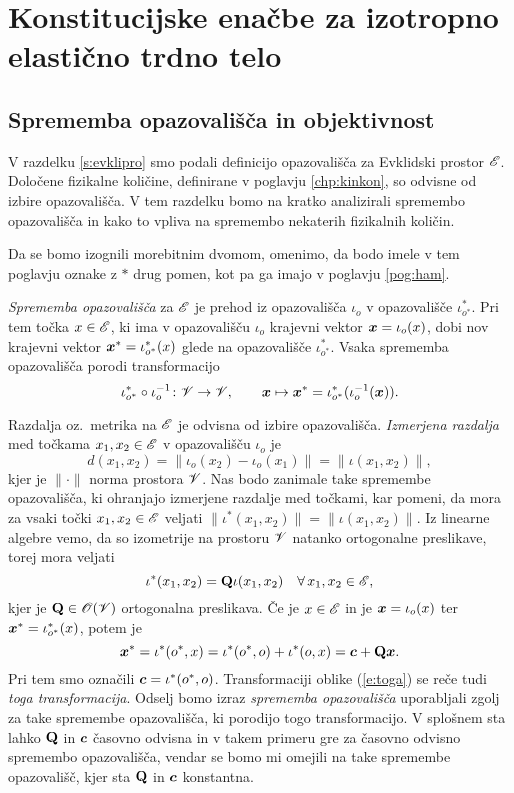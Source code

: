 \appendix

\chapter{Konstitucijske enačbe za izotropno elastično trdno telo}


\section{Sprememba opazovališča in objektivnost}


V razdelku \ref{s:evklipro} smo podali definicijo opazovališča za Evklidski
prostor $\mathscr E$. Določene fizikalne količine, definirane v poglavju \ref{chp:kinkon},
so odvisne od izbire opazovališča. V tem razdelku bomo na kratko analizirali spremembo opazovališča
in kako to vpliva na spremembo nekaterih fizikalnih količin.

Da se bomo izognili morebitnim dvomom, omenimo, da bodo imele
v tem poglavju oznake z $*$ drug pomen, kot pa ga imajo v poglavju \ref{pog:ham}.

\emph{Sprememba opazovališča} za $\mathscr E$ je prehod iz opazovališča $\iota_o$ v opazovališče
$\iota^*_{o^*}$. Pri tem točka $x\in\mathscr E$, ki ima v opazovališču $\iota_o$ krajevni vektor
$\boldsymbol x=\iota_o(x)$, dobi nov krajevni vektor $\boldsymbol x^*=\iota^*_{o^*}(x)$ glede na opazovališče
$\iota^*_{o^*}$. Vsaka sprememba opazovališča porodi transformacijo
\[
	\iota^*_{o^*}\circ\iota_o^{-1}\colon\mathscr V\to\mathscr V,\qquad
	\boldsymbol x\mapsto\boldsymbol x^*=\iota^*_{o^*}(\iota_o^{-1}(\boldsymbol x)).
\]

Razdalja oz.~metrika na $\mathscr E$ je odvisna od izbire opazovališča. \emph{Izmerjena razdalja} med točkama
$x_1,x_2\in\mathscr E$ v opazovališču $\iota_o$ je
\[ d(x_1,x_2)=\|\iota_o(x_2)-\iota_o(x_1)\|=\|\iota(x_1,x_2)\|, \]
kjer je $\|\cdot\|$ norma prostora $\mathscr V$. Nas bodo zanimale take
spremembe opazovališča, ki ohranjajo izmerjene razdalje med točkami, kar pomeni,
da mora za vsaki točki $x_1,x_2\in\mathscr E$ veljati
$\|\iota^*(x_1,x_2)\|=\|\iota(x_1,x_2)\|$.
Iz linearne algebre vemo, da so izometrije na prostoru $\mathscr V$ natanko ortogonalne preslikave,
torej mora veljati
\begin{equation} \label{e:vektrans}
	\iota^*(x_1,x_2)=\mathbf Q\iota(x_1,x_2)\quad\forall\, x_1,x_2\in\mathscr E,
\end{equation}
kjer je $\mathbf Q\in\mathscr{O}(\mathscr V)$ ortogonalna preslikava. Če je $x\in\mathscr E$ in
je $\boldsymbol x=\iota_o(x)$ ter $\boldsymbol x^*=\iota^*_{o^*}(x)$, potem je
\begin{equation} \label{e:toga}
	\boldsymbol x^*=\iota^*(o^*,x)=\iota^*(o^*,o)+\iota^*(o,x)=\boldsymbol c+\mathbf Q\boldsymbol x.
\end{equation}
Pri tem smo označili $\boldsymbol c=\iota^*(o^*,o)$. Transformaciji oblike (\ref{e:toga})
se reče tudi \emph{toga transformacija}. Odselj bomo izraz \textit{sprememba opazovališča}
uporabljali zgolj za take spremembe opazovališča, ki porodijo togo transformacijo.
V splošnem sta lahko $\mathbf Q$ in $\boldsymbol c$ časovno odvisna in v takem primeru
gre za časovno odvisno spremembo opazovališča, vendar se bomo mi omejili na
take spremembe opazovališč, kjer sta $\mathbf Q$ in $\boldsymbol c$ konstantna.

